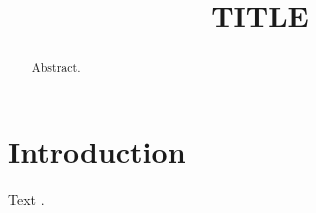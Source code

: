 \documentclass[conference]{IEEEtran}
\begin{document}
\title{{{TITLE}}}
\author{
}
\maketitle
\begin{abstract}
Abstract.
\end{abstract}
\section{Introduction}
Text \cite{example2024}.


\end{document}
